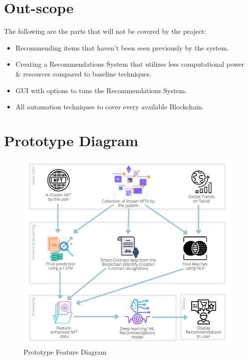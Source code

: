 \documentclass[a4paper, 12pt, oneside]{report}
\begin{document}
\section{Out-scope}
The following are the parts that will not be covered by the project:
\begin{itemize}
\item Recommending items that haven't been seen previously by the system.
\item Creating a Recommendations System that utilizes less computational power \& resources compared to baseline techniques.
\item GUI with options to tune the Recommendations System.
\item All automation techniques to cover every available Blockchain.
\end{itemize}

\section{Prototype Diagram}
\begin{figure}[ht!]
\centering
\includegraphics[width=\textwidth]{images/Protyotype Feature Diagram.png}
\caption{Prototype Feature Diagram}
\end{figure}


\end{document}
